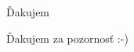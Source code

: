 \documentclass{beamer}
\begin{document}
\begin{frame}
	\titlepage
\end{frame}
\begin{frame}
	\tableofcontents
\end{frame}



\begin{frame}[plain]{Ďakujem}
	\begin{center}
		Ďakujem za pozornosť :-)
	\end{center}
\end{frame}
\end{document}
